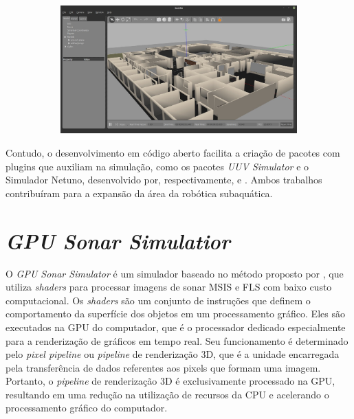 \begin{figure}[H]
\begin{subfigure}[t]{0.45\textwidth}
    \end{subfigure}
    \begin{subfigure}[t]{0.45\textwidth}
        \includegraphics[width=\textwidth]{dados/figuras/gazebo4.jpeg}
    \end{subfigure}
\end{figure}

Contudo, o desenvolvimento em código aberto facilita a criação de pacotes com plugins que auxiliam na simulação, como os pacotes \textit{UUV Simulator} e o Simulador Netuno, desenvolvido por, respectivamente, \cite{manhaes2016uuv} e \cite{longaray2017}. Ambos trabalhos contribuíram para a expansão da área da robótica subaquática.

\section{\textit{GPU Sonar Simulatior}}
\label{sec:gpu_sonar_sim}

O \textit{GPU Sonar Simulator} é um simulador baseado no método proposto por \cite{cerqueira2016gpu}, que utiliza \textit{shaders} para processar imagens de sonar MSIS e FLS com baixo custo computacional. 
Os \textit{shaders} são um conjunto de instruções que definem o comportamento da superfície dos objetos em um processamento gráfico.
Eles são executados na GPU do computador, que é o processador dedicado especialmente para a renderização de gráficos em tempo real. 
Seu funcionamento é determinado pelo \textit{pixel pipeline} ou \textit{pipeline} de renderização 3D, que é a unidade encarregada pela transferência de dados referentes aos pixels que formam uma imagem. 
Portanto, o \textit{pipeline} de renderização 3D é exclusivamente processado na GPU, resultando em uma redução na utilização de recursos da CPU e acelerando o processamento gráfico do computador. 

